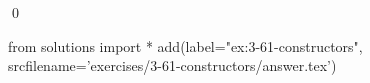 
\begin{ex}
  \label{ex:3-61-constructors}
  
  \qed
\end{ex}
\begin{python0}
from solutions import *
add(label="ex:3-61-constructors",
    srcfilename='exercises/3-61-constructors/answer.tex')
\end{python0}
